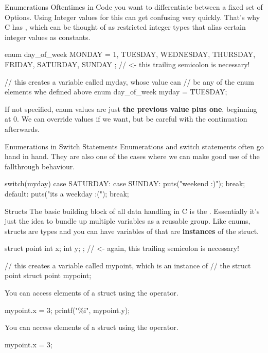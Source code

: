 \documentclass[10pt,graphics,aspectratio=169,table]{beamer}
\begin{document}
\begin{frame}[fragile]{Enumerations}
    Oftentimes in Code you want to differentiate between a fixed set of Options.
    Using Integer values for this can get confusing very quickly. That's why
    C has , which can be thought of as restricted integer types 
    that alias certain integer values as constants.
    \begin{codeblock}
enum day_of_week{
    MONDAY = 1,  
    TUESDAY, WEDNESDAY, THURSDAY,
    FRIDAY, SATURDAY, SUNDAY
}; // <- this trailing semicolon is necessary!

// this creates a variable called myday, whose value can
// be any of the enum elements whe defined above
enum day_of_week myday = TUESDAY; 
    \end{codeblock}

    If not specified, enum values are just \textbf{the previous value plus one},
    beginning at 0. We can override values if we want, but be careful with the
    continuation afterwards.
\end{frame}

\begin{frame}[fragile]{Enumerations in Switch Statements}
    Enumerations and switch statements often go hand in hand.
    They are also one of the cases where we can make good use of the
    fallthrough behaviour.
    \begin{codeblock}
switch(myday){
    case SATURDAY: 
    case SUNDAY: {
        puts("weekend :)");
    } break;
    default: {
        puts("its a weekday :("); 
    } break;
}
    \end{codeblock}
\end{frame}

\begin{frame}[fragile]{Structs}
    The basic building block of all data handling in C is the .
    Essentially it's just the idea to bundle up multiple variables as a reusable
    group. Like enums, structs are types and you can have variables of 
    that are \textbf{instances} of the struct.
    \begin{codeblock}
struct point{
    int x;
    int y;
}; // <- again, this trailing semicolon is necessary!

// this creates a variable called mypoint, which is an instance of
// the struct point
struct point mypoint;
    \end{codeblock}

    You can access elements of a struct using the  operator.
    \begin{codeblock}
mypoint.x = 3;
printf("\%i\n", mypoint.y);
    \end{codeblock}

    You can access elements of a struct using the  operator.
    \begin{codeblock}
mypoint.x = 3;
    \end{codeblock}
    
\end{frame}
\end{document}
